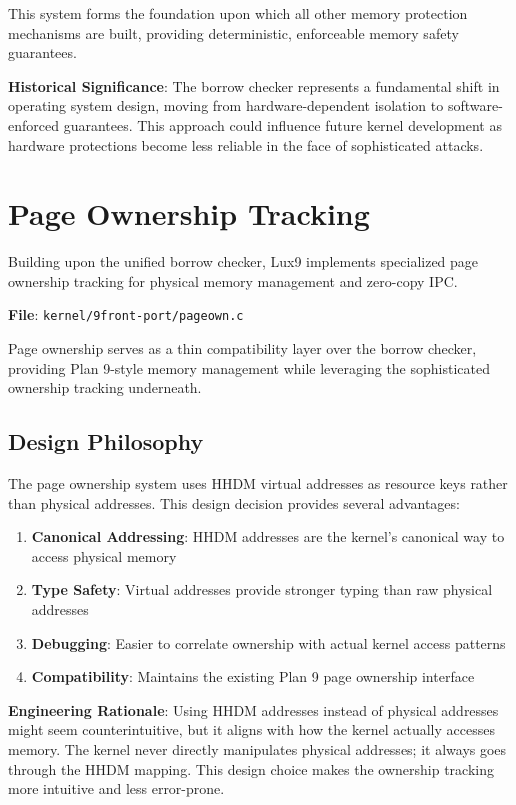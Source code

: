 \documentclass[11pt,letterpaper]{article}
\begin{document}
This system forms the foundation upon which all other memory protection mechanisms are built, providing deterministic, enforceable memory safety guarantees.

\textbf{Historical Significance}: The borrow checker represents a fundamental shift in operating system design, moving from hardware-dependent isolation to software-enforced guarantees. This approach could influence future kernel development as hardware protections become less reliable in the face of sophisticated attacks.

\section{Page Ownership Tracking}

Building upon the unified borrow checker, Lux9 implements specialized page ownership tracking for physical memory management and zero-copy IPC.

\textbf{File}: \texttt{kernel/9front-port/pageown.c}

Page ownership serves as a thin compatibility layer over the borrow checker, providing Plan 9-style memory management while leveraging the sophisticated ownership tracking underneath.

\subsection{Design Philosophy}

The page ownership system uses HHDM virtual addresses as resource keys rather than physical addresses. This design decision provides several advantages:

\begin{enumerate}
\item \textbf{Canonical Addressing}: HHDM addresses are the kernel's canonical way to access physical memory
\item \textbf{Type Safety}: Virtual addresses provide stronger typing than raw physical addresses
\item \textbf{Debugging}: Easier to correlate ownership with actual kernel access patterns
\item \textbf{Compatibility}: Maintains the existing Plan 9 page ownership interface
\end{enumerate}

\textbf{Engineering Rationale}: Using HHDM addresses instead of physical addresses might seem counterintuitive, but it aligns with how the kernel actually accesses memory. The kernel never directly manipulates physical addresses; it always goes through the HHDM mapping. This design choice makes the ownership tracking more intuitive and less error-prone.
\end{document}
